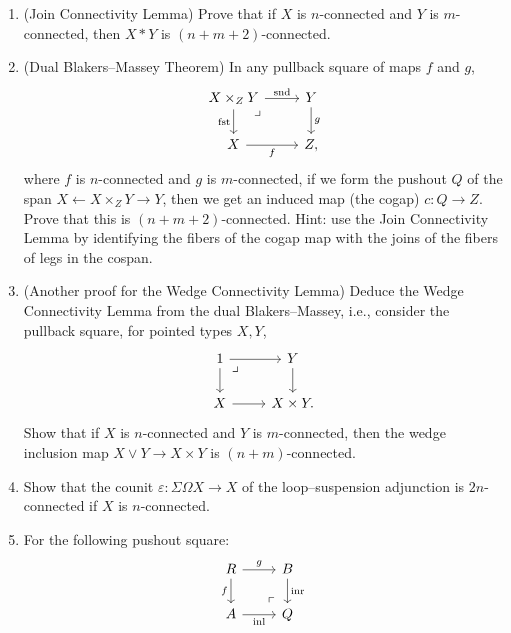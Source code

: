 \documentclass[10pt,oneside,leqno,openright]{memoir}
\begin{document}
\begin{enumerate}
\item (Join Connectivity Lemma)
  \label{lem:join-connectivity}
  Prove that if $X$ is $n$-connected and $Y$ is $m$-connected, then $X*Y$ is $(n+m+2)$-connected.
\item (Dual Blakers--Massey Theorem)
  \label{thm:dual-BM}
  In any pullback square of maps $f$ and $g$,
  \[
    \begin{tikzcd}
      X\times_ZY \ar[r,"\snd"]\ar[d,"\fst"']\pbcorner & Y\ar[d,"g"] \\
      X \ar[r,"f"'] & Z,
    \end{tikzcd}
  \]
  where $f$ is $n$-connected and $g$ is $m$-connected, if we form the pushout $Q$ of
  the span $X \leftarrow X\times_ZY \to Y$, then we get an induced
  map (the cogap) $c : Q \to Z$. Prove that this is $(n+m+2)$-connected. Hint: use the Join
  Connectivity Lemma by identifying the fibers of the
  cogap map with the joins of the fibers of legs in the cospan.

\item (Another proof for the Wedge Connectivity Lemma) Deduce the Wedge Connectivity Lemma from the dual Blakers--Massey,
  i.e., consider the pullback square, for pointed types $X,Y$,
  \[
    \begin{tikzcd}
      1 \ar[d]\ar[r]\pbcorner & Y \ar[d] \\
      X \ar[r] & X\times Y.
    \end{tikzcd}
  \]
  Show that if $X$ is $n$-connected and $Y$ is $m$-connected, then the wedge
  inclusion map $X \vee Y \to X \times Y$ is $(n+m)$-connected.

\item Show that the counit $\varepsilon : \Sigma\Omega X \to X$ of the loop--suspension adjunction is $2n$-connected if $X$ is $n$-connected.

\item 
    For the following pushout square:
  \[
    \begin{tikzcd}
      R \ar[d,"f"']\ar[r,"g"]\pocorner & B\ar[d,"{\inr}"] \\
      A\ar[r,"{\inl}"'] & Q
    \end{tikzcd}
  \]
  \begin{enumerate}
    [label=(\roman*)]


\end{enumerate}
\end{enumerate}
\end{document}
